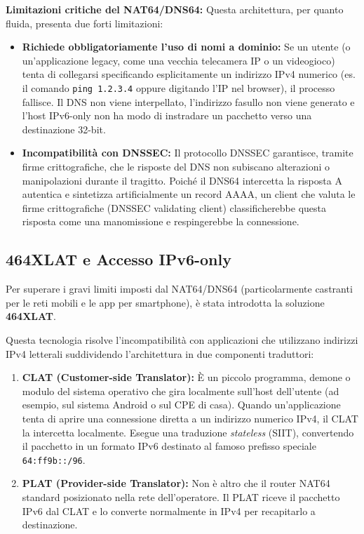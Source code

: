 \textbf{Limitazioni critiche del NAT64/DNS64:}
Questa architettura, per quanto fluida, presenta due forti limitazioni:
\begin{itemize}
\item \textbf{Richiede obbligatoriamente l'uso di nomi a dominio:} Se un utente (o un'applicazione legacy, come una vecchia telecamera IP o un videogioco) tenta di collegarsi specificando esplicitamente un indirizzo IPv4 numerico (es. il comando \texttt{ping 1.2.3.4} oppure digitando l'IP nel browser), il processo fallisce. Il DNS non viene interpellato, l'indirizzo fasullo non viene generato e l'host IPv6-only non ha modo di instradare un pacchetto verso una destinazione 32-bit.
\item \textbf{Incompatibilità con DNSSEC:} Il protocollo DNSSEC garantisce, tramite firme crittografiche, che le risposte del DNS non subiscano alterazioni o manipolazioni durante il tragitto. Poiché il DNS64 intercetta la risposta A autentica e sintetizza artificialmente un record AAAA, un client che valuta le firme crittografiche (DNSSEC validating client) classificherebbe questa risposta come una manomissione e respingerebbe la connessione.
\end{itemize}

\subsection{464XLAT e Accesso IPv6-only}
Per superare i gravi limiti imposti dal NAT64/DNS64 (particolarmente castranti per le reti mobili e le app per smartphone), è stata introdotta la soluzione \textbf{464XLAT}.

Questa tecnologia risolve l'incompatibilità con applicazioni che utilizzano indirizzi IPv4 letterali suddividendo l'architettura in due componenti traduttori:
\begin{enumerate}
\item \textbf{CLAT (Customer-side Translator):} È un piccolo programma, demone o modulo del sistema operativo che gira localmente sull'host dell'utente (ad esempio, sul sistema Android o sul CPE di casa). Quando un'applicazione tenta di aprire una connessione diretta a un indirizzo numerico IPv4, il CLAT la intercetta localmente. Esegue una traduzione \textit{stateless} (SIIT), convertendo il pacchetto in un formato IPv6 destinato al famoso prefisso speciale \texttt{64:ff9b::/96}.
\item \textbf{PLAT (Provider-side Translator):} Non è altro che il router NAT64 standard posizionato nella rete dell'operatore. Il PLAT riceve il pacchetto IPv6 dal CLAT e lo converte normalmente in IPv4 per recapitarlo a destinazione.
\end{enumerate}

